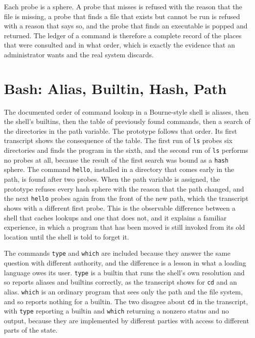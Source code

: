 
Each probe is a sphere. A probe that misses is refused with the reason that the file is missing, a probe that finds a file that exists but cannot be run is refused with a reason that says so, and the probe that finds an executable is popped and returned. The ledger of a command is therefore a complete record of the places that were consulted and in what order, which is exactly the evidence that an administrator wants and the real system discards.

\section{Bash: Alias, Builtin, Hash, Path}

The documented order of command lookup in a Bourne-style shell \cite{bash-ref} is aliases, then the shell's builtins, then the table of previously found commands, then a search of the directories in the path variable. The prototype follows that order. Its first transcript shows the consequence of the table. The first run of \texttt{ls} probes six directories and finds the program in the sixth, and the second run of \texttt{ls} performs no probes at all, because the result of the first search was bound as a \texttt{hash} sphere. The command \texttt{hello}, installed in a directory that comes early in the path, is found after two probes. When the path variable is assigned, the prototype refuses every hash sphere with the reason that the path changed, and the next \texttt{hello} probes again from the front of the new path, which the transcript shows with a different first probe. This is the observable difference between a shell that caches lookups and one that does not, and it explains a familiar experience, in which a program that has been moved is still invoked from its old location until the shell is told to forget it.


The commands \texttt{type} and \texttt{which} are included because they answer the same question with different authority, and the difference is a lesson in what a loading language owes its user. \texttt{type} is a builtin that runs the shell's own resolution and so reports aliases and builtins correctly, as the transcript shows for \texttt{cd} and an alias. \texttt{which} is an ordinary program that sees only the path and the file system, and so reports nothing for a builtin. The two disagree about \texttt{cd} in the transcript, with \texttt{type} reporting a builtin and \texttt{which} returning a nonzero status and no output, because they are implemented by different parties with access to different parts of the state.

